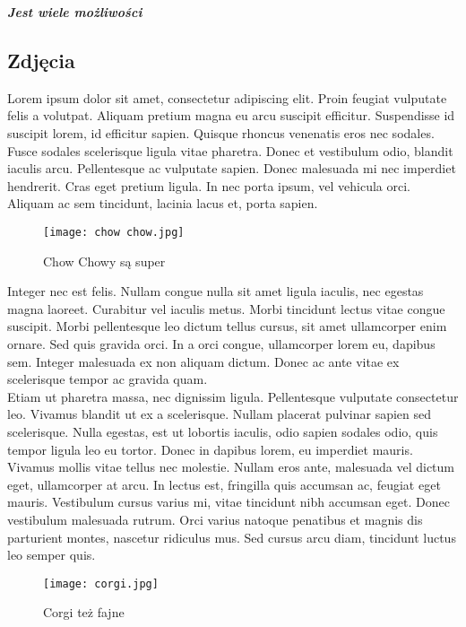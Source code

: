 \documentclass{article}
\begin{document}
\textbf{\textit{\Huge{Jest wiele możliwości}}}

\subsection{Zdjęcia}

Lorem ipsum dolor sit amet, consectetur adipiscing elit. Proin feugiat vulputate felis a volutpat. Aliquam pretium magna eu arcu suscipit efficitur. Suspendisse id suscipit lorem, id efficitur sapien. Quisque rhoncus venenatis eros nec sodales. Fusce sodales scelerisque ligula vitae pharetra. Donec et vestibulum odio, blandit iaculis arcu. Pellentesque ac vulputate sapien. Donec malesuada mi nec imperdiet hendrerit. Cras eget pretium ligula. In nec porta ipsum, vel vehicula orci. Aliquam ac sem tincidunt, lacinia lacus et, porta sapien.

\begin{figure}[ht]
	\centering
	\texttt{[image: chow chow.jpg]} 
	\caption{\cite{chow chow} Chow Chowy są super}
	\label{chow chow}
\end{figure}

Integer nec est felis. Nullam congue nulla sit amet ligula iaculis, nec egestas magna laoreet. Curabitur vel iaculis metus. Morbi tincidunt lectus vitae congue suscipit. Morbi pellentesque leo dictum tellus cursus, sit amet ullamcorper enim ornare. Sed quis gravida orci. In a orci congue, ullamcorper lorem eu, dapibus sem. Integer malesuada ex non aliquam dictum. Donec ac ante vitae ex scelerisque tempor ac gravida quam. \\

 Etiam ut pharetra massa, nec dignissim ligula. Pellentesque vulputate consectetur leo. Vivamus blandit ut ex a scelerisque. Nullam placerat pulvinar sapien sed scelerisque. Nulla egestas, est ut lobortis iaculis, odio sapien sodales odio, quis tempor ligula leo eu tortor. Donec in dapibus lorem, eu imperdiet mauris. Vivamus mollis vitae tellus nec molestie. Nullam eros ante, malesuada vel dictum eget, ullamcorper at arcu. In lectus est, fringilla quis accumsan ac, feugiat eget mauris. Vestibulum cursus varius mi, vitae tincidunt nibh accumsan eget. Donec vestibulum malesuada rutrum. Orci varius natoque penatibus et magnis dis parturient montes, nascetur ridiculus mus. Sed cursus arcu diam, tincidunt luctus leo semper quis.
 
\begin{figure}[ht]
	\centering
	\texttt{[image: corgi.jpg]} 
	\caption{\cite{corgi} Corgi też fajne}
	\label{corgi}
\end{figure}
\end{document}
